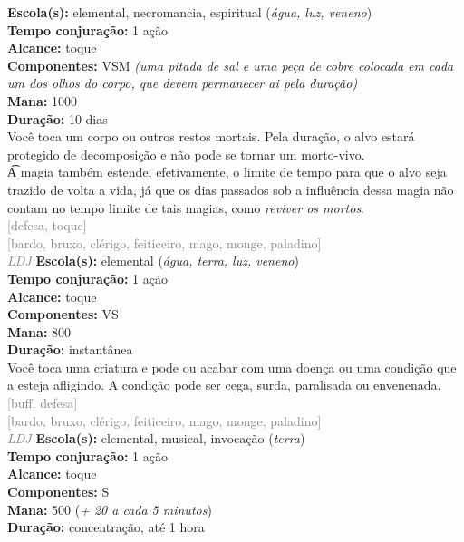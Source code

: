 \documentclass{RPG_Adventure}[2021/10/20]
\begin{document}
{\small \t \textbf{Escola(s):} elemental, necromancia, espiritual (\textit{água, luz, veneno})\\\t \textbf{Tempo conjuração:} 1 ação\\\t \textbf{Alcance:} toque\\\t \textbf{Componentes:} VSM \textit{(uma pitada de sal e uma peça de cobre colocada em cada um dos olhos do corpo, que devem permanecer ai pela duração)}\\\t \textbf{Mana:} 1000\\\t \textbf{Duração:} 10 dias\\}
{\normalsize Você toca um corpo ou outros restos mortais. Pela duração, o alvo estará protegido de decomposição e não pode se tornar um morto-vivo.\\\t A magia também estende, efetivamente, o limite de tempo para que o alvo seja trazido de volta a vida, já que os dias passados sob a influência dessa magia não contam no tempo limite de tais magias, como \textit{reviver os mortos}.\\}
{\scriptsize \textcolor{gray}{[defesa, toque]\\}}
{\scriptsize \textcolor{gray}{[bardo, bruxo, clérigo, feiticeiro, mago, monge, paladino]\\}}
{\tiny \textcolor{gray}{\textit{LDJ}}}
{\small \t \textbf{Escola(s):} elemental (\textit{água, terra, luz, veneno})\\\t \textbf{Tempo conjuração:} 1 ação\\\t \textbf{Alcance:} toque\\\t \textbf{Componentes:} VS\\\t \textbf{Mana:} 800\\\t \textbf{Duração:} instantânea\\}
{\normalsize Você toca uma criatura e pode ou acabar com uma doença ou uma condição que a esteja afligindo. A condição pode ser cega, surda, paralisada ou envenenada.\\}
{\scriptsize \textcolor{gray}{[buff, defesa]\\}}
{\scriptsize \textcolor{gray}{[bardo, bruxo, clérigo, feiticeiro, mago, monge, paladino]\\}}
{\tiny \textcolor{gray}{\textit{LDJ}}}
{\small \t \textbf{Escola(s):} elemental, musical, invocação (\textit{terra})\\\t \textbf{Tempo conjuração:} 1 ação\\\t \textbf{Alcance:} toque\\\t \textbf{Componentes:} S\\\t \textbf{Mana:} 500 (\textit{+ 20 a cada 5 minutos})\\\t \textbf{Duração:} concentração, até 1 hora\\}
\end{document}
